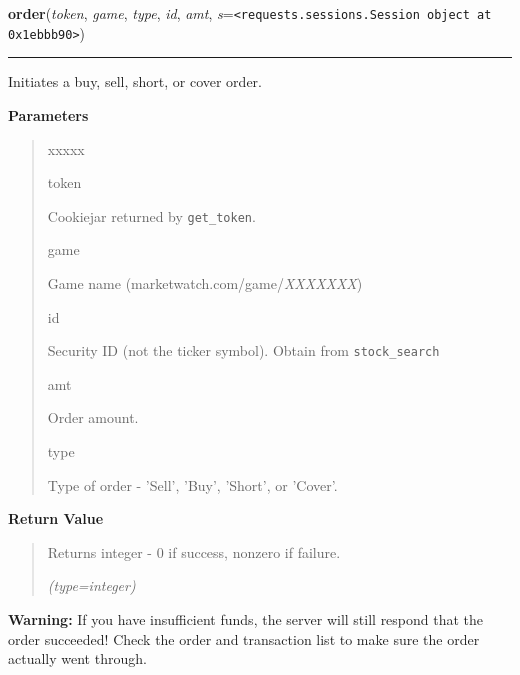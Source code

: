     \vspace{0.5ex}

\hspace{.8\funcindent}\begin{boxedminipage}{\funcwidth}

    \raggedright \textbf{order}(\textit{token}, \textit{game}, \textit{type}, \textit{id}, \textit{amt}, \textit{s}={\tt {\textless}requests.sessions.Session object at 0x1ebbb90{\textgreater}})

    \vspace{-1.5ex}

    \rule{\textwidth}{0.5\fboxrule}
\setlength{\parskip}{2ex}
    Initiates a buy, sell, short, or cover order.

\setlength{\parskip}{1ex}
      \textbf{Parameters}
      \vspace{-1ex}

      \begin{quote}
        \begin{Ventry}{xxxxx}

          \item[token]

          Cookiejar returned by \texttt{get\_token}.

          \item[game]

          Game name (marketwatch.com/game/\textit{XXXXXXX})

          \item[id]

          Security ID (not the ticker symbol). Obtain from 
          \texttt{stock\_search}

          \item[amt]

          Order amount.

          \item[type]

          Type of order - 'Sell', 'Buy', 'Short', or 'Cover'.

        \end{Ventry}

      \end{quote}

      \textbf{Return Value}
    \vspace{-1ex}

      \begin{quote}
      Returns integer - 0 if success, nonzero if failure.

      {\it (type=integer)}

      \end{quote}

\textbf{Warning:} If you have insufficient funds, the server will still respond that the 
order succeeded! Check the order and transaction list to make sure the 
order actually went through.



    \end{boxedminipage}

